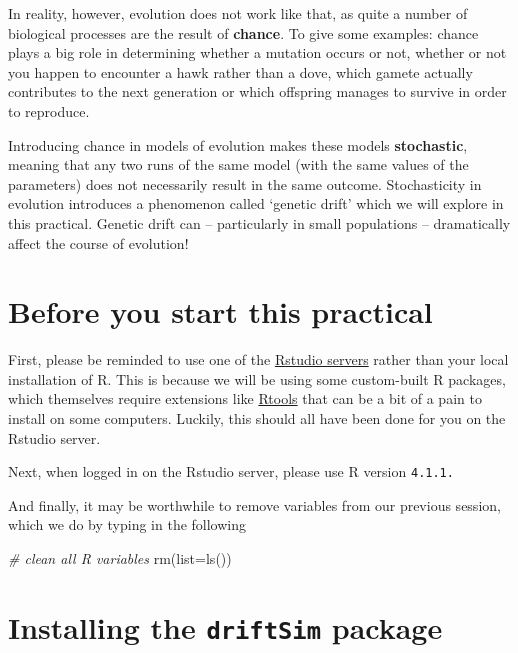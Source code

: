 \documentclass[
]{book}
\newenvironment{Shaded}{\begin{snugshade}}{\end{snugshade}}
\newcommand{\AttributeTok}[1]{\textcolor[rgb]{0.77,0.63,0.00}{#1}}
\newcommand{\CommentTok}[1]{\textcolor[rgb]{0.56,0.35,0.01}{\textit{#1}}}
\newcommand{\FunctionTok}[1]{\textcolor[rgb]{0.00,0.00,0.00}{#1}}
\newcommand{\NormalTok}[1]{#1}
\begin{document}
In reality, however, evolution does not work like that, as quite a number of biological processes are the result of \textbf{chance}. To give some examples: chance plays a big role in determining whether a mutation occurs or not, whether or not you happen to encounter a hawk rather than a dove, which gamete actually contributes to the next generation or which offspring manages to survive in order to reproduce.

Introducing chance in models of evolution makes these models \textbf{stochastic}, meaning that any two runs of the same model (with the same values of the parameters) does not necessarily result in the same outcome. Stochasticity in evolution introduces a phenomenon called `genetic drift' which we will explore in this practical. Genetic drift can -- particularly in small populations -- dramatically affect the course of evolution!

\hypertarget{before-you-start-this-practical}{%
\section{Before you start this practical}\label{before-you-start-this-practical}}

First, please be reminded to use one of the \href{https://rstudio01.cles.ex.ac.uk}{Rstudio servers} rather than your local installation of R. This is because we will be using some custom-built R packages, which themselves require extensions like \href{https://cran.r-project.org/bin/windows/Rtools/}{Rtools} that can be a bit of a pain to install on some computers. Luckily, this should all have been done for you on the Rstudio server.

Next, when logged in on the Rstudio server, please use R version \texttt{4.1.1.}

And finally, it may be worthwhile to remove variables from our previous session, which we do by typing in the following

\begin{Shaded}
\begin{Highlighting}[]
\CommentTok{\# clean all R variables}
\FunctionTok{rm}\NormalTok{(}\AttributeTok{list=}\FunctionTok{ls}\NormalTok{())}
\end{Highlighting}
\end{Shaded}

\hypertarget{installing-the-driftsim-package}{%
\section{\texorpdfstring{Installing the \texttt{driftSim} package}{Installing the driftSim package}}\label{installing-the-driftsim-package}}
\end{document}
